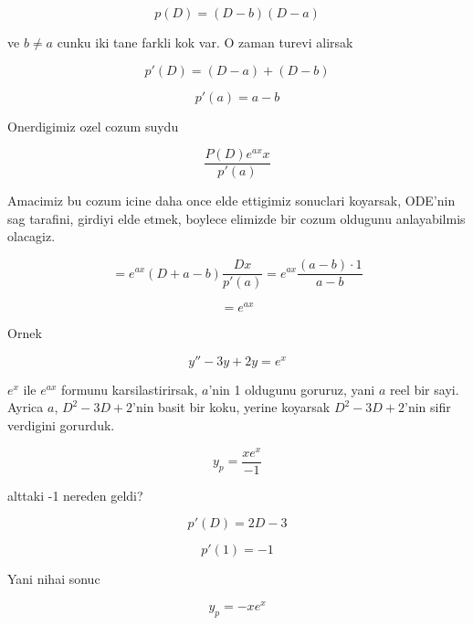\documentclass[12pt,fleqn]{article}
\begin{document}
\[ p(D) = (D-b)(D-a) \]

ve $b \ne a$ cunku iki tane farkli kok var. O zaman turevi alirsak

\[ p'(D) = (D-a) + (D-b) \]

\[ p'(a) = a-b \]

Onerdigimiz ozel cozum suydu

\[ \frac{P(D) e^{ax} x}{p'(a)} \]

Amacimiz bu cozum icine daha once elde ettigimiz sonuclari koyarsak,
ODE'nin sag tarafini, girdiyi elde etmek, boylece elimizde bir cozum
oldugunu anlayabilmis olacagiz. 

\[ = e^{ax}(D+a-b)\frac{Dx}{p'(a)} = e^{ax} \frac{(a-b) \cdot 1}{a-b} \]

\[ = e^{ax} \]

Ornek

\[ y'' - 3y + 2y = e^x \]

$e^x$ ile $e^{ax}$ formunu karsilastirirsak, $a$'nin 1 oldugunu goruruz,
yani $a$ reel bir sayi. Ayrica $a$, $D^2-3D+2$'nin basit bir koku, yerine
koyarsak $D^2-3D+2$'nin sifir verdigini gorurduk. 

\[ y_p = \frac{xe^x}{-1} \]

alttaki -1 nereden geldi? 

\[ p'(D) = 2D - 3 \]

\[ p'(1) = -1 \]

Yani nihai sonuc

\[ y_p = -xe^x \]
\end{document}
